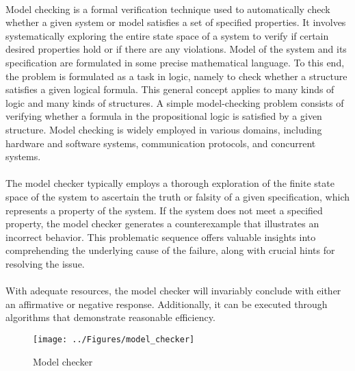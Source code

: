 \paragraph*{}
Model checking is a formal verification technique used to automatically check whether a given system or model satisfies a set of specified properties. It involves systematically exploring the entire state space of a system to verify if certain desired properties hold or if there are any violations. Model of the system and its specification are formulated in some precise mathematical language. To this end, the problem is formulated as a task in logic, namely to check whether a structure satisfies a given logical formula. This general concept applies to many kinds of logic and many kinds of structures. A simple model-checking problem consists of verifying whether a formula in the propositional logic is satisfied by a given structure. Model checking is widely employed in various domains, including hardware and software systems, communication protocols, and concurrent systems.
\paragraph*{}
The model checker typically employs a thorough exploration of the finite state space of the system to ascertain the truth or falsity of a given specification, which represents a property of the system. If the system does not meet a specified property, the model checker generates a counterexample that illustrates an incorrect behavior. This problematic sequence offers valuable insights into comprehending the underlying cause of the failure, along with crucial hints for resolving the issue.
\paragraph*{}
With adequate resources, the model checker will invariably conclude with either an affirmative or negative response. Additionally, it can be executed through algorithms that demonstrate reasonable efficiency.
\begin{figure}[h]
	\centering
	\texttt{[image: ../Figures/model\_checker]}
	\caption{Model checker}
	\label{fig:modelchecker}
\end{figure}
\pagebreak
